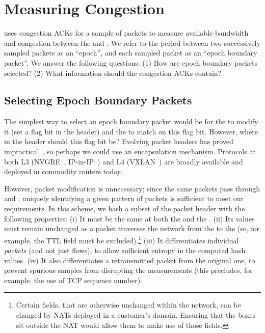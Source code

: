 \section{Measuring Congestion}\label{s:measurement}

\name uses congestion ACKs for a sample of packets to measure available bandwidth and congestion between the \inbox and \outbox. 
We refer to the period between two successively sampled packets as an ``epoch'', and each sampled packet as an ``epoch boundary packet''.
We answer the following questions: (1) How are epoch boundary packets selected? (2) What information should the congestion ACKs contain?

\subsection{Selecting Epoch Boundary Packets}
\label{s:measure:marking}

The simplest way to select an epoch boundary packet would be for the \inbox to modify it (\ie set a flag bit in the header) and the \outbox to match on this flag bit.
However, where in the header should this flag bit be?
Evolving packet headers has proved impractical~\cite{trotsky}, so perhaps we could use an encapsulation mechanism.
Protocols at both L3 (\eg NVGRE~\cite{nvgre}, IP-in-IP~\cite{ipinip}) and L4 (\eg VXLAN~\cite{vxlan}) are broadly available and deployed in commodity routers today.

However, packet modification is unnecessary; since the same packets pass through \inbox and \outbox, uniquely identifying a given pattern of packets is sufficient to meet our requirements. In this scheme, we hash a subset of the packet header with the following properties:
(i) It must be the same at both the \inbox and the \outbox.
(ii) Its values must remain unchanged as a packet traverses the network from the \inbox to the \outbox (so, for example, the TTL field must be excluded).\footnote{Certain fields, that are otherwise unchanged within the network, can be changed by NATs deployed in a customer's domain. Ensuring that the \name boxes sit outside the NAT would allow them to make use of those fields.}
(iii) It differentiates individual \emph{packets} (and not just flows), to allow sufficient entropy in the computed hash values.
(iv) It also differentiates a retransmitted packet from the original one, to prevent spurious samples from disrupting the measurements (this precludes, for example, the use of TCP sequence number).

